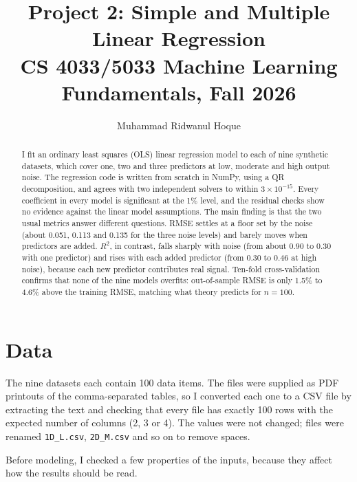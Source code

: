 \documentclass[11pt]{article}
\title{\textbf{Project 2: Simple and Multiple Linear Regression}\\[2pt]
\large CS 4033/5033 Machine Learning Fundamentals, Fall 2026}
\author{Muhammad Ridwanul Hoque}
\date{}
\begin{document}
\maketitle

\begin{abstract}
I fit an ordinary least squares (OLS) linear regression model to each of nine synthetic datasets, which cover one, two and three predictors at low, moderate and high output noise. The regression code is written from scratch in NumPy, using a QR decomposition, and agrees with two independent solvers to within $3\times10^{-15}$. Every coefficient in every model is significant at the 1\% level, and the residual checks show no evidence against the linear model assumptions. The main finding is that the two usual metrics answer different questions. RMSE settles at a floor set by the noise (about 0.051, 0.113 and 0.135 for the three noise levels) and barely moves when predictors are added. $R^2$, in contrast, falls sharply with noise (from about 0.90 to 0.30 with one predictor) and rises with each added predictor (from 0.30 to 0.46 at high noise), because each new predictor contributes real signal. Ten-fold cross-validation confirms that none of the nine models overfits: out-of-sample RMSE is only 1.5\% to 4.6\% above the training RMSE, matching what theory predicts for $n = 100$.
\end{abstract}

\tableofcontents
\newpage

\section{Data}

The nine datasets each contain 100 data items. The files were supplied as PDF printouts of the comma-separated tables, so I converted each one to a CSV file by extracting the text and checking that every file has exactly 100 rows with the expected number of columns (2, 3 or 4). The values were not changed; files were renamed \texttt{1D\_L.csv}, \texttt{2D\_M.csv} and so on to remove spaces.

Before modeling, I checked a few properties of the inputs, because they affect how the results should be read.
\end{document}
